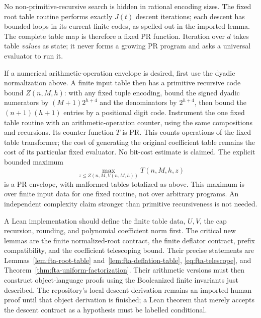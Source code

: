 No non-primitive-recursive search is hidden in rational encoding sizes.
The fixed root table routine performs exactly $J(t)$ descent iterations;
each descent has bounded loops in its current finite codes, as spelled
out in the imported lemma.  The complete table map is therefore a fixed
PR function.  Iteration over $d$ takes table \emph{values} as state; it
never forms a growing PR program and asks a universal evaluator to run it.

If a numerical arithmetic-operation envelope is desired, first use the dyadic
normalization above.  A finite input table then has a primitive recursive
code bound $Z(n,M,h)$: with any fixed tuple encoding, bound the signed
dyadic numerators by $(M+1)2^{h+4}$ and the denominators by $2^{h+4}$,
then bound the $(n+1)(h+1)$ entries by a positional digit code.  Instrument
the one fixed table routine with an arithmetic-operation counter, using
the same compositions and recursions.  Its counter function $T$ is PR. This counts operations of the fixed table
transformer; the cost of generating the original coefficient table remains
the cost of its particular fixed evaluator. No bit-cost estimate is claimed.
The explicit bounded maximum
\[
 \max_{z\le Z(n,M,V(n,M,h))}
      T(n,M,h,z)
\]
is a PR envelope, with malformed tables totalized as above.  This maximum
is over finite input data for one fixed routine, not over arbitrary
programs.  An independent complexity claim stronger than primitive
recursiveness is not needed.

A Lean implementation should define the finite table data, $U,V$, the
cap recursion, rounding, and polynomial coefficient norm first.  The
critical new lemmas are the finite normalized-root contract,
the finite deflator contract, prefix compatibility, and the coefficient
telescoping bound.  Their precise statements are
Lemmas~\ref{lem:fta-root-table} and~\ref{lem:fta-deflation-table},
\eqref{eq:fta-telescope}, and
Theorem~\ref{thm:fta-uniform-factorization}.  Their arithmetic versions
must then construct object-language proofs using the Booleanized finite
invariants just described.  The repository's local descent derivation
remains an imported human proof until that object derivation is finished;
a Lean theorem that merely accepts the descent contract as a hypothesis
must be labelled conditional.
